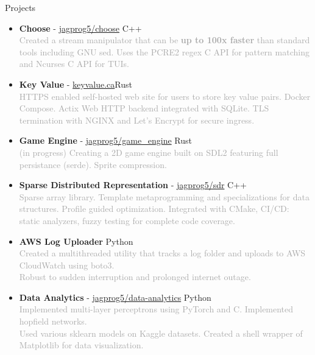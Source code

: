 \documentclass{resume} %
\begin{document}
\begin{rSection}{Projects}
    \begin{itemize}
        \setlength\itemsep{-0.2em}
        \item {\bf Choose} - \href{https://github.com/jagprog5/choose/}{jagprog5/choose} \hfill C++\\
        \textcolor{darkgray}{Created a stream manipulator that can be \textbf{up to 100x faster} than standard tools including GNU sed.
        Uses the PCRE2 regex C API for pattern matching and Ncurses C API for TUIs.}
        \item {\bf Key Value} - \href{http://www.keyvalue.ca/}{keyvalue.ca}\hfill Rust\\
        \textcolor{darkgray}{HTTPS enabled self-hosted web site for users to store key value pairs. Docker Compose. Actix Web HTTP backend integrated with SQLite. TLS termination with NGINX and Let's Encrypt for secure ingress.}
        \item {\bf Game Engine} - \href{https://github.com/jagprog5/game_engine/}{jagprog5/game\_engine} \hfill Rust\\
        \textcolor{darkgray}{(in progress) Creating a 2D game engine built on SDL2 featuring full persistance (serde). Sprite compression.}
        \item {\bf Sparse Distributed Representation} - \href{https://github.com/jagprog5/SDR/}{jagprog5/sdr} \hfill C++\\
        \textcolor{darkgray}{Sparse array library. Template metaprogramming and specializations for data structures. Profile guided optimization. Integrated with CMake, CI/CD: static analyzers, fuzzy testing for complete code coverage.}
        \item {\bf AWS Log Uploader} \hfill Python\\
        \textcolor{darkgray}{Created a multithreaded utility that tracks a log folder and uploads to AWS CloudWatch using boto3.\\
        Robust to sudden interruption and prolonged internet outage.}
        \item {\bf Data Analytics} - \href{https://github.com/jagprog5/resume/blob/main/data-analytics-projects.md}{jagprog5/data-analytics} \hfill Python\\
        \textcolor{darkgray}{Implemented multi-layer perceptrons using PyTorch and C. Implemented hopfield networks.\\
        Used various sklearn models on Kaggle datasets. Created a shell wrapper of Matplotlib for data visualization.}
    \end{itemize}
\end{rSection}
\end{document}
